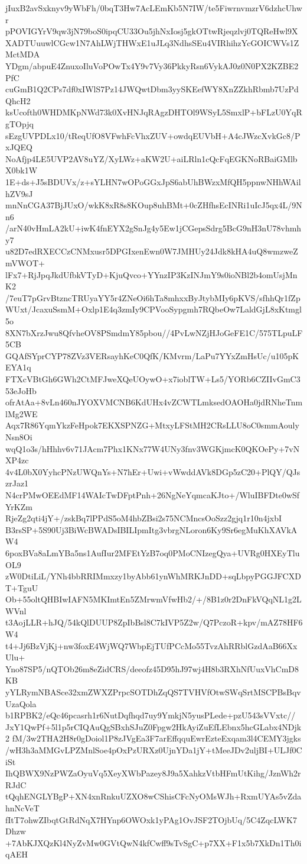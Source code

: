 jIuxB2avSxknyv9yWbFh/0bqT3Hw7AcLEmKb5N7IW/te5FiwrnvmzrV6dzhcUhwr
pPOVIGYrV9qw3jN79boS0ipqCU33Ou5jhNxIosj5gkOTtwRjeqzlvj0TQReHwl9X
XADTUuuwlCGcw1N7AhLWjTHWxE1uJLq3NdhsSEu4VIRhihzYcGOICWVs1ZMctMDA
YDgm/abpuE4ZnuxoIluVoPOwTx4Y9v7Vy36PkkyRsn6VykAJ0z0N0PX2KZBE2PfC
cuGmB1Q2CPs7df0xIWlS7Pz14JWQwtDbm3yySKEefWY8XnZZkhRbmb7UzPdQhcH2
ksUcofth0WHDMKpNWd73k0XvHNJqRAgzDHTOl9WSyL5SmxlP+bFLzU0YqRgTOpjq
sEzgUVPDLx10/tReqUfO8VFwhFcVhxZUV+owdqEUVbH+A4cJWzcXvkGc8/PxJQEQ
NoAfjp4LE5UVP2AV8uYZ/XyLWz+aKW2U+aiLRln1cQcFqEGKNoRBaiGMlbX0bk1W
1E+ds+J5sBDUVx/z+sYLHN7wOPoGGxJpS6abUhBWzxMfQH5ppnwNHhWAilhZV9sJ
mnNnCGA37BjJUxO/wkK8xR8s8KOup8uhBMt+0cZHfhsEcINRi1uIcJ5qx4L/9Nn6
/arN40vHmLA2kU+iwK4fnEYX2gSnJg4y5Ew1jCGepsSdrg5BcG9nH3nU78vhmhy7
u82D7edRXECCzCNMxusr5DPGIxenEwn0W7JMHUy24Jdk8kHA4uQ8wmzweZmVWOT+
lFx7+RjJpqJkdUfbkVTyD+KjuQvco+YYnzIP3KzINJmY9s0ioNBl2b4omUsjMnK2
/7euT7pGrvBtzncTRUyaYY5r4ZNeOi6hTa8mhxxByJtybMIy6pKVS/sfhhQr1fZp
WUxt/JcaxuSsmM+Oxlp1E4q3zmIy9CPVooSypgmh7RQbeOw7LaldGjL8xKtmgl5o
8XN7bXrzJwu8QfvheOV8PSmdmY85pbou//4PvLwNZjHJoGeFE1C/575TLpuLF5CB
GQAfSYprCYP78ZVz3VERsayhKeC0QfK/KMvrm/LaPu7YYxZmHsUc/u105pKEYA1q
FTXcVBtGh6GWh2CtMFJweXQeUOywO+x7ioblTW+Ls5/YORb6CZIIvGmC353eJoHb
ofrAtAa+8vLn460nJYOXVMCNB6KdUHx4vZCWTLmksedOAOHa0jdRNheTnmlMg2WE
Aqx7R86YqmYkzFeHpok7EKXSPNZG+MtxyLFStMH2CRsLLU8oC0smmAoulyNsn8Oi
wqQ1o3s/hHhhv6v71JAcm7Phx1KNx77W4UNy3fnv3WGKjmcK0QKOePy+7vNXP4zc
4v4L0bX0YyhcPNzUWQnYs+N7hEr+Uwi+vWwddAVk8DGp5zC20+PlQY/QJszrJaz1
N4crPMwOEEdMF14WAIcTwDFptPnh+26NgNeYqmcaKJto+/WluIBFDte0wSfYrKZm
RjeZg2qti4jY+/zskBq7lPPdS5oM4hbZBsi2s75NCMncsOoSzz2gjq1r10n4jxbI
B3rsSP+5S90Uj3BiWcBWADsIBILIpmItg3vbrgNLoron6Ky9Sr6egMuKhXAVkAW4
6poxBVa8aLmYBa5ns1AufIur2MFEtYzB7oq0PMoCNIzegQya+UVRg0HXEyTluOL9
zW0DtiLiL/YNh4bbRRIMmxzy1byAbb61ynWhMRKJnDD+sqLbpyPGGJFCXDT+TguU
Ob+55oltQHBIwIAFN5MKImtEn5ZMrwmVfwHb2/+/8B1z0r2DnFkVQqNL1g2LWVnl
t3AojLLR+hJQ/54kQlDUUP8ZpIbBsl8C7kIVP5Z2w/Q7PczoR+kpv/mAZ78HF6W4
t4+Jj6BzVjKj+nw3foxE4WjWQ7WbpEjTUfPCcMo55TvzAhRRblGzdAaB66XxUlu+
Yno87SP5/nQTOb26m8eZidCRS/deeofz45D95hJ97wj4H8b3RXhNfUuxVhCmD8KB
yYLRymNBASce32xmZWXZPrpcSOTDhZqQS7TVHVfOtwSWqSrtMSCPBsBqvUzaQola
b1RPBK2/eQc46pcasrh1r6NutDqfhqd7uy9YmkjN5yusPLede+pzU543sVVxtc//
JxY1QwPf+5l1p5rCIQAuQgSBxhSJuZ0Fpgw2HkAyiZuEfLEbnx5hcGLabx4NDjk2
fM/3w2THA2H8r0gDoiol1P8zJVgEa3F7arEffqquEwrEzteExqam3l4CEMY3jgks
/wH3h3aMMGvLPZMnlSoe4pOxPzURXz0UjnYDa1jY+tMeeJDv2uljBI+ULJf0CiSt
IhQBWX9NzPWZaOyuVq5XeyXWbPazey8J9a5XahkzVtbHFmUtKihg/JznWh2rRJdC
tQqhENGLYBgP+XN4xnRnkuUZXO8wCShisCFcNyOMsWJh+RxmUYAs5vZdahnNcVeT
fItT7ohwZIbqtGtRdNqX7HYnp6OWOxk1yPAg1OvJSF2TOjbUq/5C4ZqcLWK7Dhzw
+7AbKJXQzKl4NyZvMw0GVtQwN4kfCwff9sTvSgC+p7XX+F1x5b7XkDn1Th0iqAEH
